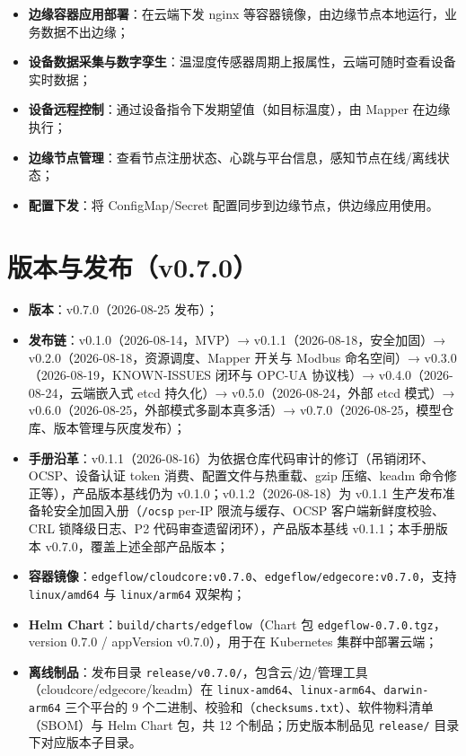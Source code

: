 \begin{itemize}
  \item \textbf{边缘容器应用部署}：在云端下发 nginx 等容器镜像，由边缘节点本地运行，业务数据不出边缘；
  \item \textbf{设备数据采集与数字孪生}：温湿度传感器周期上报属性，云端可随时查看设备实时数据；
  \item \textbf{设备远程控制}：通过设备指令下发期望值（如目标温度），由 Mapper 在边缘执行；
  \item \textbf{边缘节点管理}：查看节点注册状态、心跳与平台信息，感知节点在线/离线状态；
  \item \textbf{配置下发}：将 ConfigMap/Secret 配置同步到边缘节点，供边缘应用使用。
\end{itemize}

\section{版本与发布（v0.7.0）}

\begin{itemize}
  \item \textbf{版本}：v0.7.0（2026-08-25 发布）；
  \item \textbf{发布链}：v0.1.0（2026-08-14，MVP）→ v0.1.1（2026-08-18，安全加固）→ v0.2.0（2026-08-18，资源调度、Mapper 开关与 Modbus 命名空间）→ v0.3.0（2026-08-19，KNOWN-ISSUES 闭环与 OPC-UA 协议栈）→ v0.4.0（2026-08-24，云端嵌入式 etcd 持久化）→ v0.5.0（2026-08-24，外部 etcd 模式）→ v0.6.0（2026-08-25，外部模式多副本真多活）→ v0.7.0（2026-08-25，模型仓库、版本管理与灰度发布）；
  \item \textbf{手册沿革}：v0.1.1（2026-08-16）为依据仓库代码审计的修订（吊销闭环、OCSP、设备认证 token 消费、配置文件与热重载、gzip 压缩、keadm 命令修正等），产品版本基线仍为 v0.1.0；v0.1.2（2026-08-18）为 v0.1.1 生产发布准备轮安全加固入册（\texttt{/ocsp} per-IP 限流与缓存、OCSP 客户端新鲜度校验、CRL 锁降级日志、P2 代码审查遗留闭环），产品版本基线 v0.1.1；本手册版本 v0.7.0，覆盖上述全部产品版本；
  \item \textbf{容器镜像}：\texttt{edgeflow/cloudcore:v0.7.0}、\texttt{edgeflow/edgecore:v0.7.0}，支持 \texttt{linux/amd64} 与 \texttt{linux/arm64} 双架构；
  \item \textbf{Helm Chart}：\texttt{build/charts/edgeflow}（Chart 包 \texttt{edgeflow-0.7.0.tgz}，version 0.7.0 / appVersion v0.7.0），用于在 Kubernetes 集群中部署云端；
  \item \textbf{离线制品}：发布目录 \texttt{release/v0.7.0/}，包含云/边/管理工具（cloudcore/edgecore/keadm）在 \texttt{linux-amd64}、\texttt{linux-arm64}、\texttt{darwin-arm64} 三个平台的 9 个二进制、校验和（\texttt{checksums.txt}）、软件物料清单（SBOM）与 Helm Chart 包，共 12 个制品；历史版本制品见 \texttt{release/} 目录下对应版本子目录。
\end{itemize}

